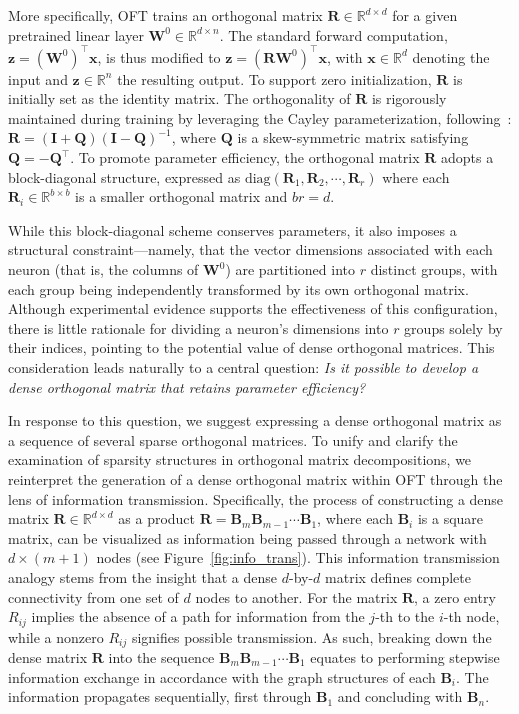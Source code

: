 More specifically, OFT trains an orthogonal matrix $\bm{R}\in\mathbb{R}^{d\times d}$ for a given pretrained linear layer $\bm{W}^0\in\mathbb{R}^{d\times n}$. The standard forward computation, $\bm{z}=(\bm{W}^0)^\top\bm{x}$, is thus modified to $\bm{z}=(\bm{R}\bm{W}^0)^\top\bm{x}$, with $\bm{x}\in\mathbb{R}^{d}$ denoting the input and $\bm{z}\in\mathbb{R}^{n}$ the resulting output. To support zero initialization, $\bm{R}$ is initially set as the identity matrix. The orthogonality of $\bm{R}$ is rigorously maintained during training by leveraging the Cayley parameterization, following~\cite{qiu2023controlling,liu2021orthogonal}: $\bm{R}=(\bm{I}+\bm{Q})(\bm{I}-\bm{Q})^{-1}$, where $\bm{Q}$ is a skew-symmetric matrix satisfying $\bm{Q}=-\bm{Q}^\top$. To promote parameter efficiency, the orthogonal matrix $\bm{R}$ adopts a block-diagonal structure, expressed as $\text{diag}(\bm{R}_1,\bm{R}_2,\cdots,\bm{R}_r)$ where each $\bm{R}_i\in\mathbb{R}^{b\times b}$ is a smaller orthogonal matrix and $br=d$.

While this block-diagonal scheme conserves parameters, it also imposes a structural constraint—namely, that the vector dimensions associated with each neuron (that is, the columns of $\bm{W}^0$) are partitioned into $r$ distinct groups, with each group being independently transformed by its own orthogonal matrix. Although experimental evidence supports the effectiveness of this configuration, there is little rationale for dividing a neuron's dimensions into $r$ groups solely by their indices, pointing to the potential value of dense orthogonal matrices. This consideration leads naturally to a central question: \emph{Is it possible to develop a dense orthogonal matrix that retains parameter efficiency?}

In response to this question, we suggest expressing a dense orthogonal matrix as a sequence of several sparse orthogonal matrices. To unify and clarify the examination of sparsity structures in orthogonal matrix decompositions, we reinterpret the generation of a dense orthogonal matrix within OFT through the lens of information transmission. Specifically, the process of constructing a dense matrix $\bm{R}\in\mathbb{R}^{d\times d}$ as a product $\bm{R}=\bm{B}_m\bm{B}_{m-1}\cdots\bm{B}_1$, where each $\bm{B}_i$ is a square matrix, can be visualized as information being passed through a network with $d\times (m+1)$ nodes (see Figure~\ref{fig:info_trans}). This information transmission analogy stems from the insight that a dense $d$-by-$d$ matrix defines complete connectivity from one set of $d$ nodes to another. For the matrix $\bm{R}$, a zero entry $R_{ij}$ implies the absence of a path for information from the $j$-th to the $i$-th node, while a nonzero $R_{ij}$ signifies possible transmission. As such, breaking down the dense matrix $\bm{R}$ into the sequence $\bm{B}_m\bm{B}_{m-1}\cdots\bm{B}_1$ equates to performing stepwise information exchange in accordance with the graph structures of each $\bm{B}_i$. The information propagates sequentially, first through $\bm{B}_1$ and concluding with $\bm{B}_n$. 


